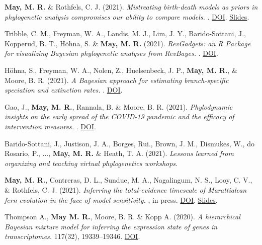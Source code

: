 \begin{etaremune}[topsep=0pt,itemsep=1.2em,partopsep=0pt,parsep=0pt]
    \item \textbf{May, M. R.} \& Rothfels, C. J. (2021). \textit{Mistreating birth-death models as priors in phylogenetic analysis compromises our ability to compare models.} . \href{https://www.biorxiv.org/content/10.1101/2021.07.12.452074v1}{DOI}. \href{https://www.youtube.com/watch?v=SWldXeWet68&feature=youtu.be}{Slides}.
    \item Tribble, C. M., Freyman, W. A., Landis, M. J., Lim, J. Y., Barido-Sottani, J., Kopperud, B. T., Höhna, S. \& \textbf{May, M. R.} (2021). \textit{RevGadgets: an R Package for visualizing Bayesian phylogenetic analyses from RevBayes.} . \href{https://www.biorxiv.org/content/10.1101/2021.05.10.443470v1}{DOI}.
    \item Höhna, S., Freyman, W. A., Nolen, Z., Huelsenbeck, J. P., \textbf{May, M. R.}, \& Moore, B. R. (2021). \textit{A Bayesian approach for estimating branch-specific speciation and extinction rates.} . \href{https://www.biorxiv.org/content/10.1101/2021.07.12.452074v1}{DOI}.
    \item Gao, J., \textbf{May, M. R.}, Rannala, B. \& Moore, B. R. (2021). \textit{Phylodynamic insights on the early spread of the COVID-19 pandemic and the efficacy of intervention measures.} . \href{https://www.biorxiv.org/content/10.1101/2021.05.01.442286v1}{DOI}.
    \item Barido-Sottani, J., Justison, J. A., Borges, Rui., Brown, J. M., Dismukes, W., do Rosario, P., ..., \textbf{May, M. R.} \& Heath, T. A. (2021). \textit{Lessons learned from organizing and teaching virtual phylogenetics workshops.} 
    \item \textbf{May, M. R.}, Contreras, D. L., Sundue, M. A., Nagalingum, N. S., Looy, C. V., \& Rothfels, C. J. (2021). \textit{Inferring the total-evidence timescale of Marattialean fern evolution in the face of model sensitivity.} , in press. \href{https://doi.org/10.1093/sysbio/syab020}{DOI}. \href{https://www.youtube.com/watch?v=5H_u9bjn064}{Slides}.
    \item Thompson A., \textbf{May M. R.}, Moore, B. R. \& Kopp A. (2020). \textit{A hierarchical Bayesian mixture model for inferring the expression state of genes in transcriptomes.}  117(32), 19339–19346. \href{https://doi.org/10.1073/pnas.1919748117}{DOI}.

\end{etaremune}
